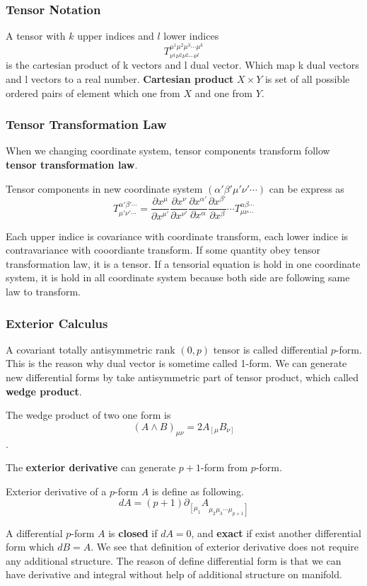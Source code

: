 \documentclass[12pt]{article}
\theoremstyle{mystyle}{\newtheorem{definition}{Definition}[section]}
\theoremstyle{mystyle}{\newtheorem{theorem}[definition]{Theorem}}
\theoremstyle{mystyle}{\newtheorem*{remark}{Remark}}
\theoremstyle{mystyle}{\newtheorem*{example}{Example}}
\theoremstyle{mystyle}{\newtheorem*{examples}{Examples}}
\theoremstyle{cstyle}{\newtheorem*{cthm}{}}
\begin{document}
\subsubsection{Tensor Notation}
A tensor with \(k\) upper indices and \(l\) lower indices
\[T^{\mu^1 \mu^2 \mu^3 \cdots \mu^k}_{\nu^1\nu^2\nu^2\cdots \nu^l}\]
is the cartesian product of k vectors and l dual vector. Which map k dual vectors and l vectors to a real number.
\textbf{Cartesian product} $X \times Y$ is set of all possible ordered pairs of element which one from $X$ and one from $Y$.

\subsubsection{Tensor Transformation Law}
When we changing coordinate system, tensor components transform follow \textbf{tensor transformation law}.
\begin{definition}
  Tensor components in new coordinate system \((\alpha'\beta'\mu'\nu'\cdots)\) can be express as
  \[T^{\alpha'\beta'\cdots}_{\mu'\nu'\cdots} =
    \frac{\partial x^{\mu}}{\partial x^{\mu'}}\frac{\partial x^{\nu}}{\partial x^{\nu'}}\frac{\partial x^{\alpha'}}{\partial x^{\alpha}}
    \frac{\partial x^{\beta'}}{\partial x^{\beta}} \cdots
    T^{\alpha\beta\cdots}_{\mu\nu\cdots}\]
\end{definition}
Each upper indice is covariance with coordinate transform, each lower indice is contravariance with cooordiante transform.
If some quantity obey tensor transformation law, it is a tensor. If a tensorial equation is hold in one coordinate system,
it is hold in all coordinate
system because both side are following same law to transform.

\subsubsection{Exterior Calculus}
A covariant totally antisymmetric rank \((0,p)\) tensor is called differential \(p\)-form. This is the reason why dual vector is sometime called 1-form. 
We can generate new differential forms by take antisymmetric part of tensor product, which called \textbf{wedge product}.
\begin{example}
  The wedge product of two one form is \[(A\wedge B)_{\mu\nu}= 2A_{\left[\mu\right.}B_{\left.\nu\right]}\].
\end{example} 
The \textbf{exterior derivative} can generate \(p+1\)-form from \(p\)-form.
\begin{definition}
  Exterior derivative of a \(p\)-form \(A\) is define as following.
  \[dA = (p+1)\partial_{\left[\mu_1\right.}A_{\left.\mu_2\mu_3\cdots\mu_{p+1}\right]}\]
\end{definition}
A differential \(p\)-form \(A\) is \textbf{closed} if \(dA =0\), and \textbf{exact} if exist another differential form which \(dB = A\).
We see that definition of exterior derivative does not require any additional structure. 
The reason of define differential form is that we can have derivative and integral without help of additional structure on manifold.
\end{document}
